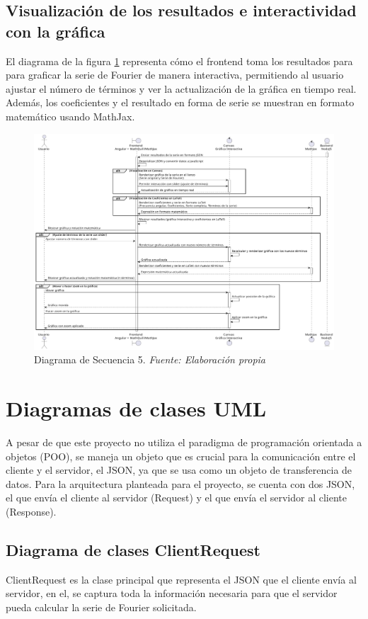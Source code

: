 \subsection{Visualización de los resultados e interactividad con la gráfica}
El diagrama de  la figura \ref{fig:Diagrama_secuencia_5} representa cómo el frontend toma los resultados para para graficar la serie de Fourier de manera interactiva, permitiendo al usuario ajustar el número de términos y ver la actualización de la gráfica en tiempo real. Además, los coeficientes y el resultado en forma de serie se muestran en formato matemático usando MathJax.
\begin{figure}[H]
	\centering
	\includegraphics[width=1\textwidth]{img/chapter04/D5-6.pdf}
	\caption[Diagrama de Secuencia 5.]{Diagrama de Secuencia 5. \textit{Fuente: \textit{Elaboración propia}}}
	\label{fig:Diagrama_secuencia_5}
\end{figure}

\newpage

\section{Diagramas de clases UML}
A pesar de que este proyecto no utiliza el paradigma de programación orientada a objetos (POO), se maneja un objeto que es crucial para la comunicación entre el cliente y el servidor, el JSON, ya que se usa como un objeto de transferencia de datos. Para la arquitectura planteada para el proyecto, se cuenta con dos JSON, el que envía el cliente al servidor (Request) y el que envía el servidor al cliente (Response). 

\subsection{Diagrama de clases ClientRequest}
ClientRequest es la clase principal que representa el JSON que el cliente envía al servidor, en el, se captura toda la información necesaria para que el servidor pueda calcular la serie de Fourier solicitada. \newline

